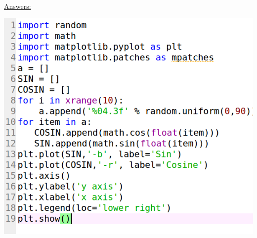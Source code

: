 \documentclass{WeSTassignment}
\begin{document}
\underline{Answers:}
\begin{enumerate}
\includegraphics[width=1\textwidth]{images/python-code.png}
\end{enumerate}



\makefooter
\end{document}
